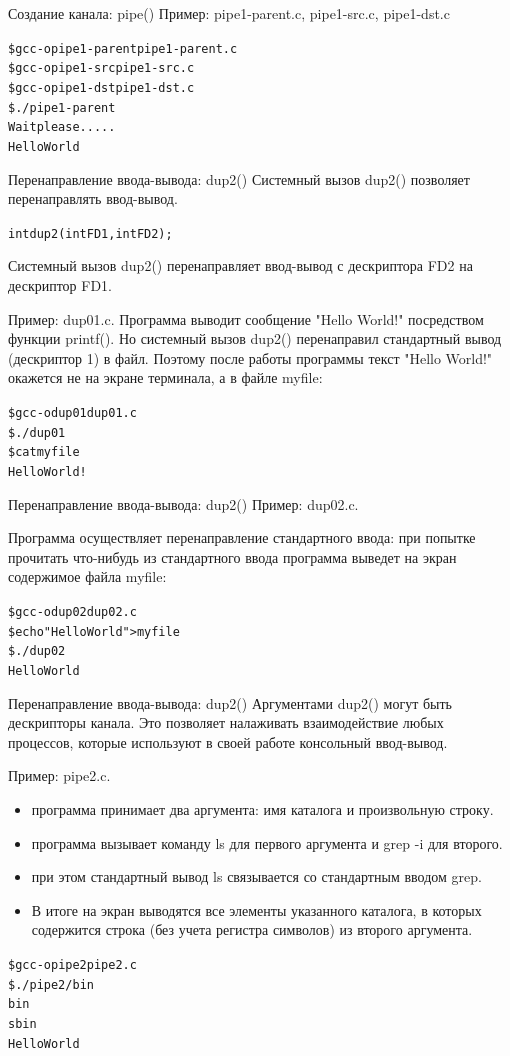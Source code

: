 \documentclass[xcolor=table]{beamer}
\begin{document}
\begin{frame}[fragile]{Создание канала: pipe()}
Пример: pipe1-parent.c, pipe1-src.c, pipe1-dst.c
\begin{alltt}
\$ gcc -o pipe1-parent pipe1-parent.c
\$ gcc -o pipe1-src pipe1-src.c
\$ gcc -o pipe1-dst pipe1-dst.c
\$ ./pipe1-parent
Wait please.....
Hello World
\end{alltt}
\end{frame}

\begin{frame}[fragile]{Перенаправление ввода-вывода: dup2()}
Системный вызов dup2() позволяет перенаправлять ввод-вывод. 
\begin{alltt}
int dup2 (int FD1, int FD2);
\end{alltt}
Системный вызов dup2() перенаправляет ввод-вывод с дескриптора FD2 на дескриптор FD1. 

Пример: dup01.c. Программа выводит сообщение "Hello World!" посредством функции printf().
Но системный вызов dup2() перенаправил стандартный вывод (дескриптор 1) в файл. Поэтому после работы программы текст "Hello World!" окажется не на экране терминала, а в файле myfile:
\begin{alltt}
\$ gcc -o dup01 dup01.c
\$ ./dup01
\$ cat myfile
Hello World!
\end{alltt}
\end{frame}

\begin{frame}[fragile]{Перенаправление ввода-вывода: dup2()}
Пример: dup02.c. 

Программа осуществляет перенаправление стандартного ввода: при попытке прочитать что-нибудь из стандартного ввода программа выведет на экран содержимое файла myfile:
\begin{alltt}
\$ gcc -o dup02 dup02.c
\$ echo "Hello World" > myfile
\$ ./dup02
Hello World
\end{alltt}
\end{frame}

\begin{frame}[fragile]{Перенаправление ввода-вывода: dup2()}
Аргументами dup2() могут быть дескрипторы канала. Это позволяет налаживать взаимодействие любых процессов, которые используют в своей работе консольный ввод-вывод. 

Пример: pipe2.c. 
\begin{itemize}
\item программа принимает два аргумента: имя каталога и произвольную строку. 
\item программа вызывает команду ls для первого аргумента и grep -i для второго. 
\item при этом стандартный вывод ls связывается со стандартным вводом grep. 
\item В итоге на экран выводятся все элементы указанного каталога, в которых содержится строка (без учета регистра символов) из второго аргумента.
\end{itemize}
\begin{alltt}
\$ gcc -o pipe2 pipe2.c
\$ ./pipe2 / bin
bin
sbin
Hello World
\end{alltt}
\end{frame}
\end{document}
